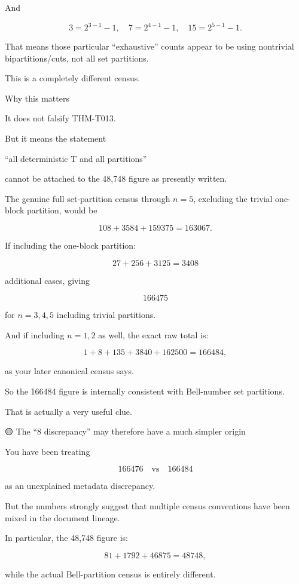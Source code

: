 And

\[
3=2^{3-1}-1,\quad  
7=2^{4-1}-1,\quad  
15=2^{5-1}-1.  
\]

That means those particular “exhaustive” counts appear to be using nontrivial bipartitions/cuts, not all set partitions.


This is a completely different census.


Why this matters


It does not falsify THM-T013.


But it means the statement




“all deterministic T and all partitions”




cannot be attached to the 48,748 figure as presently written.


The genuine full set-partition census through \(n=5\), excluding the trivial one-block partition, would be

\[
108+3584+159375  
=\boxed{163067}.  
\]

If including the one-block partition:

\[
27+256+3125=3408  
\]

additional cases, giving

\[
\boxed{166475}  
\]

for \(n=3,4,5\) including trivial partitions.


And if including \(n=1,2\) as well, the exact raw total is:

\[
1+8+135+3840+162500  
=\boxed{166484},  
\]

as your later canonical census says.


So the 166484 figure is internally consistent with Bell-number set partitions.


That is actually a very useful clue.



🟡 The “8 discrepancy” may therefore have a much simpler origin


You have been treating

\[
166476\quad\text{vs}\quad166484  
\]

as an unexplained metadata discrepancy.


But the numbers strongly suggest that multiple census conventions have been mixed in the document lineage.


In particular, the 48,748 figure is:

\[
81+1792+46875=48748,  
\]

while the actual Bell-partition census is entirely different.


